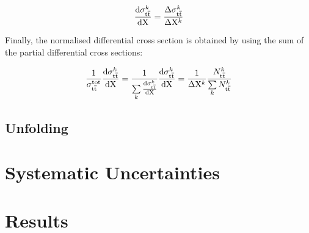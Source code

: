 \begin{equation}
\label{eq:differential_xsection}
\frac{\mathrm{d}\sigma_{\mathrm{t}\overline{\mathrm{t}}}^k}{\mathrm{d} \mathrm{X}} = \frac{\Delta\sigma_{\mathrm{t}\overline{\mathrm{t}}}^k}{\Delta \mathrm{X}^k }
\end{equation}

Finally, the normalised differential cross section is obtained by using the sum of the partial differential cross
sections:

\begin{equation}
\label{eq:normalised_differential_xsection}
\frac{1}{\sigma_{\mathrm{t}\overline{\mathrm{t}}}^\mathrm{tot}} \frac{\mathrm{d}\sigma_{\mathrm{t}\overline{\mathrm{t}}}^k}{\mathrm{d} \mathrm{X}} =
\frac{1}{\sum\limits_k{\frac{\mathrm{d}\sigma_{\mathrm{t}\overline{\mathrm{t}}}^k}{\mathrm{d} \mathrm{X}}}} \frac{\mathrm{d}\sigma_{\mathrm{t}\overline{\mathrm{t}}}^k}{\mathrm{d} \mathrm{X}}
= \frac{1}{\Delta \mathrm{X}^k} \frac{N_{\mathrm{t}\overline{\mathrm{t}}}^k}{\sum\limits_k N_{\mathrm{t}\overline{\mathrm{t}}}^k}
\end{equation}





\subsection{Unfolding}
\label{ss_xsection:unfolding}

\section{Systematic Uncertainties}
\label{s_xsection:systematics}

\section{Results}
\label{s_xsection:results}

